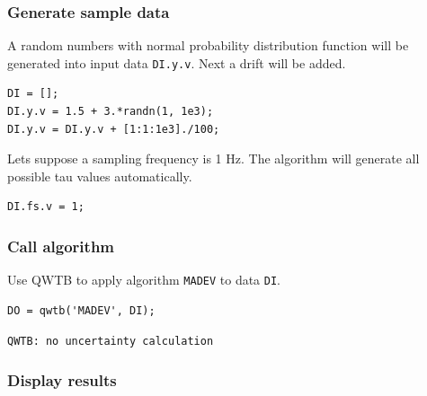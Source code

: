 \startcontents[localtoc]



{}
\subsubsection*{Generate sample data}



A random numbers with normal probability distribution function will be generated into input data \texttt{DI.y.v}. Next a drift will be added.

\begin{lstlisting}
DI = [];
DI.y.v = 1.5 + 3.*randn(1, 1e3);
DI.y.v = DI.y.v + [1:1:1e3]./100;
\end{lstlisting}


Lets suppose a sampling frequency is 1 Hz. The algorithm will generate all possible tau values automatically.

\begin{lstlisting}
DI.fs.v = 1;
\end{lstlisting}


{}
\subsubsection*{Call algorithm}



Use QWTB to apply algorithm \texttt{MADEV} to data \texttt{DI}.

\begin{lstlisting}
DO = qwtb('MADEV', DI);
\end{lstlisting}
\begin{lstlisting}[language={},xleftmargin=5pt,frame=none]
QWTB: no uncertainty calculation

\end{lstlisting}


{}
\subsubsection*{Display results}



